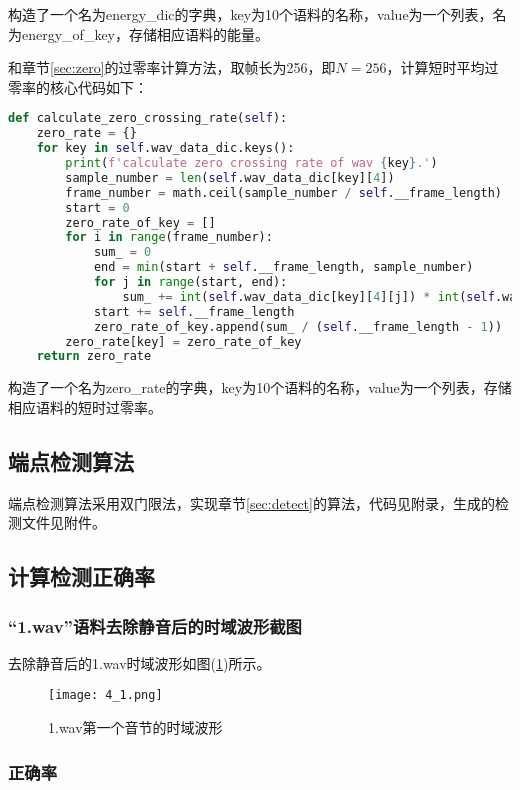 \documentclass{hitreport}
\begin{document}
构造了一个名为energy\_dic的字典，key为10个语料的名称，value为一个列表，名为energy\_of\_key，存储相应语料的能量。

和章节\ref{sec:zero}的过零率计算方法，取帧长为256，即$N=256$，计算短时平均过零率的核心代码如下：
\begin{lstlisting}[language=python]
def calculate_zero_crossing_rate(self):
    zero_rate = {}
    for key in self.wav_data_dic.keys():
        print(f'calculate zero crossing rate of wav {key}.')
        sample_number = len(self.wav_data_dic[key][4])
        frame_number = math.ceil(sample_number / self.__frame_length)
        start = 0
        zero_rate_of_key = []
        for i in range(frame_number):
            sum_ = 0
            end = min(start + self.__frame_length, sample_number)
            for j in range(start, end):
                sum_ += int(self.wav_data_dic[key][4][j]) * int(self.wav_data_dic[key][4][j - 1]) < 0
            start += self.__frame_length
            zero_rate_of_key.append(sum_ / (self.__frame_length - 1))
        zero_rate[key] = zero_rate_of_key
    return zero_rate
\end{lstlisting}

构造了一个名为zero\_rate的字典，key为10个语料的名称，value为一个列表，存储相应语料的短时过零率。


\subsection{端点检测算法}\label{sec:sec3}

端点检测算法采用双门限法，实现章节\ref{sec:detect}的算法，代码见附录，生成的检测文件见附件。

\subsection{计算检测正确率}\label{sec:sec4}

\subsubsection{“1.wav”语料去除静音后的时域波形截图}

去除静音后的1.wav时域波形如图(\ref{fig:41})所示。

\begin{figure}[htb]
	\centering
	\texttt{[image: 4\_1.png]}
	\caption{1.wav第一个音节的时域波形}\label{fig:41}
\end{figure}

\subsubsection{正确率}
\end{document}
